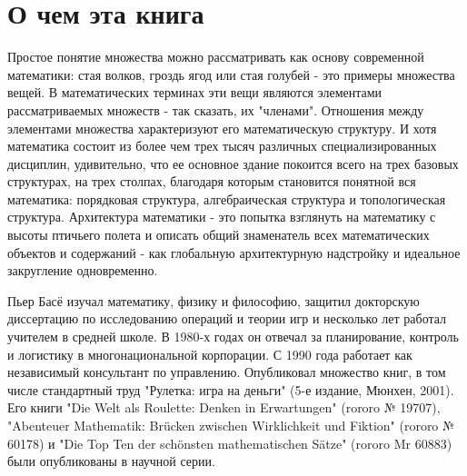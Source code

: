 \section{О чем эта книга}

Простое понятие множества можно рассматривать как основу современной математики: стая волков, гроздь ягод или стая голубей - это примеры множества вещей. В математических терминах эти вещи являются элементами рассматриваемых множеств - так сказать, их "членами". Отношения между элементами множества характеризуют его математическую структуру. И хотя математика состоит из более чем трех тысяч различных специализированных дисциплин, удивительно, что ее основное здание покоится всего на трех базовых структурах, на трех столпах, благодаря которым становится понятной вся математика: порядковая структура, алгебраическая структура и топологическая структура.
Архитектура математики - это попытка взглянуть на математику с высоты птичьего полета и описать общий знаменатель всех математических объектов и содержаний - как глобальную архитектурную надстройку и идеальное закругление одновременно.

Пьер Басё изучал математику, физику и философию, защитил докторскую диссертацию по исследованию операций и теории игр и несколько лет работал учителем в средней школе. В 1980-х годах он отвечал за планирование, контроль и логистику в многонациональной корпорации. С 1990 года работает как независимый консультант по управлению. Опубликовал множество книг, в том числе стандартный труд "Рулетка: игра на деньги" (5-е издание, Мюнхен, 2001).
Его книги "Die Welt als Roulette: Denken in Erwartungen" (rororo № 19707), "Abenteuer Mathematik: Brücken zwischen Wirklichkeit und Fiktion" (rororo № 60178) и "Die Top Ten der schönsten mathematischen Sätze" (rororo Mr 60883) были опубликованы в научной серии.
\pagebreak

